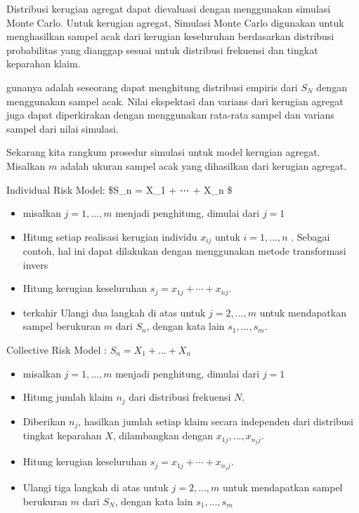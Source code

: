 \documentclass[
]{book}
\providecommand{\tightlist}{%
  \setlength{\itemsep}{0pt}\setlength{\parskip}{0pt}}
\begin{document}
Distribusi kerugian agregat dapat dievaluasi dengan menggunakan simulasi Monte Carlo. Untuk kerugian agregat, Simulasi Monte Carlo digunakan untuk menghasilkan sampel acak dari kerugian keseluruhan berdasarkan distribusi probabilitas yang dianggap sesuai untuk distribusi frekuensi dan tingkat keparahan klaim.

gunanya adalah seseorang dapat menghitung distribusi empiris dari \(S_N\) dengan menggunakan sampel acak. Nilai ekspektasi dan varians dari kerugian agregat juga dapat diperkirakan dengan menggunakan rata-rata sampel dan varians sampel dari nilai simulasi.

Sekarang kita rangkum prosedur simulasi untuk model kerugian agregat. Misalkan \(m\) adalah ukuran sampel acak yang dihasilkan dari kerugian agregat.

Individual Risk Model: \$S\_n = X\_1 + ⋯ + X\_n \$

\begin{itemize}
\tightlist
\item
  misalkan \(j=1,...,m\) menjadi penghitung, dimulai dari \(j = 1\)
\item
  Hitung setiap realisasi kerugian individu \(x_{ij}\) untuk \(i=1,...,n\) . Sebagai contoh, hal ini dapat dilakukan dengan menggunakan metode transformasi invers
\item
  Hitung kerugian keseluruhan \(s_j = x_{1j} + ⋯ + x_{nj}\).
\item
  terkahir Ulangi dua langkah di atas untuk \(j=2,...,m\) untuk mendapatkan sampel berukuran \(m\) dari \(S_n\), dengan kata lain \({s_1,...,s_m}\).
\end{itemize}

Collective Risk Model : \(S_n = X_1 + ... + X_n\)

\begin{itemize}
\tightlist
\item
  misalkan \(j=1,...,m\) menjadi penghitung, dimulai dari \(j = 1\)
\item
  Hitung jumlah klaim \(n_j\) dari distribusi frekuensi \(N\).
\item
  Diberikan \(n_j\), hasilkan jumlah setiap klaim secara independen dari distribusi tingkat keparahan \(X\), dilambangkan dengan \(x_{1j},...,x_{{n_j}j}\).
\item
  Hitung kerugian keseluruhan \(s_j = x_{1j} + ⋯ + x_{{n_j}j}\).
\item
  Ulangi tiga langkah di atas untuk \(j=2,...,m\) untuk mendapatkan sampel berukuran \(m\) dari \(S_N\), dengan kata lain \({s_1,...,s_m}\)
\end{itemize}
\end{document}

